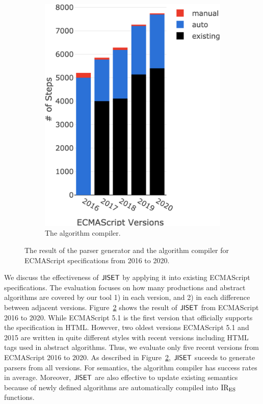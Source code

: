 \begin{figure}[t]
\begin{subfigure}{0.23\textwidth}
    \includegraphics[width=\textwidth]{img/all-version-sem.png}
    \caption{The algorithm compiler.}
    \label{fig:semantics-all-version}
  \end{subfigure}
  \caption{The result of the parser generator and the algorithm compiler for
  ECMAScript specifications from 2016 to 2020.}
  \label{fig:all-version}
\end{figure}

We discuss the effectiveness of \( \text{\sf JISET} \) by applying it into existing ECMAScript specifications.
The evaluation focuses on how many productions and abstract algorithms are covered by
our tool 1) in each version, and 2) in each difference between adjacent versions.
Figure~\ref{fig:all-version} shows the result of \( \text{\sf JISET} \) from ECMAScript 2016
to 2020. While ECMAScript 5.1 is the first version that officially supports
the specification in HTML. However, two oldest versions ECMAScript 5.1 and 2015 are written
in quite different styles with recent versions including HTML tags used in abstract algorithms.
Thus, we evaluate only five recent versions from ECMAScript 2016 to 2020.
As described in Figure~\ref{fig:all-version}, \( \text{\sf JISET} \) suceeds to generate parsers
from all versions. For semantics, the algorithm compiler has  success rates
in average. Moreover, \( \text{\sf JISET} \) are also effective to update existing semantics
because  of newly defined algorithms are automatically compiled into \( \text{IR}_\text{ES} \)
functions.

